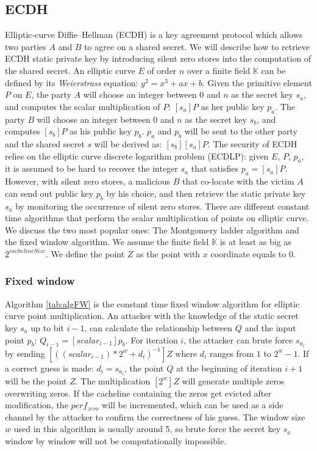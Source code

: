 \documentclass{iacrtrans}
\begin{document}
\subsection{ECDH}
Elliptic-curve Diffie–Hellman (ECDH) is a key agreement protocol which allows two parties $A$ and $B$ to agree on a shared secret. We will describe how to retrieve ECDH static private key by introducing silent zero stores into the computation of the shared secret. An elliptic curve $E$ of order $n$ over a finite field $\mathbb{K}$ can be defined by its \emph{Weierstrass} equation: $y^2 = x^3+ax+b$. Given the primitive element $P$ on $E$, the party $A$ will choose an integer between $0$ and $n$ as the secret key $s_a$, and computes the scalar multiplication of $P$: $[s_a]P$ as her public key $p_a$. The party $B$ will choose an integer between $0$ and $n$ as the secret key $s_b$, and computes $[s_b]P$ as his public key $p_b$. $p_a$ and $p_b$ will be sent to the other party and the shared secret $s$ will be derived as: $[s_b][s_a]P$. The security of ECDH relies on the elliptic curve discrete logarithm problem (ECDLP): given $E$, $P$, $p_a$, it is assumed to be hard to recover the integer $s_a$ that satisfies $p_a=[s_a]P$. However, with silent zero stores, a malicious $B$ that co-locate with the victim $A$ can send out public key $p_b$ by his choice, and then retrieve the static private key $s_a$ by monitoring the occurrence of silent zero stores. There are different constant time algorithms that perform the scalar multiplication of points on elliptic curve. We discuss the two most popular ones: The Montgomery ladder algorithm and the fixed window algorithm. We assume the finite field $\mathbb{K}$ is at least as big as $2^{cachelineSize}$. We define the point $Z$ as the point with $x$ coordinate equals to $0$.

\subsubsection{Fixed window}
Algorithm \ref{tab:algFW} is the constant time fixed window algorithm for elliptic curve point multiplication. An attacker with the knowledge of the static secret key $s_a$ up to bit $i-1$, can calculate the relationship between $Q$ and the input point $p_b$: $Q_{i-1} = [scalar_{i-1}]p_b$. For iteration $i$, the attacker can brute force $s_{a_i}$ by sending $[((scalar_{i-1})*2^w + d_i)^{-1}]Z$ where $d_i$ ranges from $1$ to $2^w-1$. If a correct guess is made: $d_i = s_{a_i}$, the point $Q$ at the beginning of iteration $i+1$ will be the point $Z$. The multiplication $[2^w]Z$ will generate multiple zeros overwriting zeros. If the cacheline containing the zeros get evicted after modification, the $perf_{zero}$ will be incremented, which can be used as a side channel by the attacker to confirm the correctness of his guess. The window size $w$ used in this algorithm is usually around 5, so brute force the secret key $s_a$ window by window will not be computationally impossible. 
\end{document}
